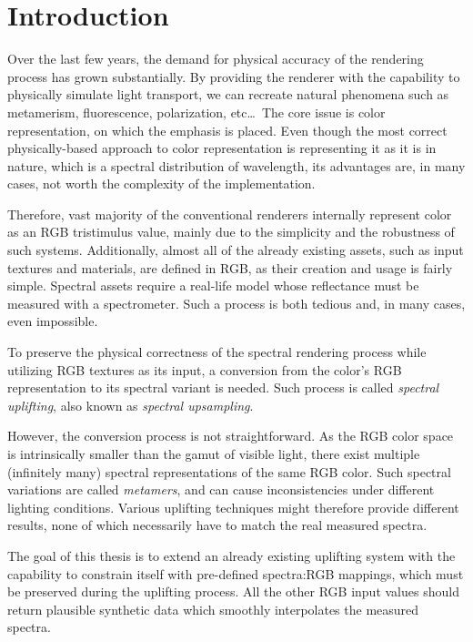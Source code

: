 \chapter*{Introduction}

Over the last few years, the demand for physical accuracy of the rendering process has grown substantially. By providing the renderer with the capability to physically simulate light transport, we can recreate natural phenomena such as metamerism, fluorescence, polarization, etc\ldots~The core issue is color representation, on which the emphasis is placed. Even though the most correct physically-based approach to color representation is representing it as it is in nature, which is a spectral distribution of wavelength, its advantages are, in many cases, not worth the complexity of the implementation.

Therefore, vast majority of the conventional renderers internally represent color as an RGB tristimulus value, mainly due to the simplicity and the robustness of such systems. Additionally, almost all of the already existing assets, such as input textures and materials, are defined in RGB, as their creation and usage is fairly simple. Spectral assets require a real-life model whose reflectance must be measured with a spectrometer. Such a process is both tedious and, in many cases, even impossible.

To preserve the physical correctness of the spectral rendering process while utilizing RGB textures as its input, a conversion from the color's RGB representation to its spectral variant is needed. Such process is called \emph{spectral uplifting}, also known as \emph{spectral upsampling}.

However, the conversion process is not straightforward. As the RGB color space is intrinsically smaller than the gamut of visible light, there exist multiple (infinitely many) spectral representations of the same RGB color. Such spectral variations are called \emph{metamers}, and can cause inconsistencies under different lighting conditions. Various uplifting techniques might therefore provide different results, none of which necessarily have to match the real measured spectra.

The goal of this thesis is to extend an already existing uplifting system with the capability to constrain itself with pre-defined spectra:RGB mappings, which must be preserved during the uplifting process. All the other RGB input values should return plausible synthetic data which smoothly interpolates the measured spectra.
 
